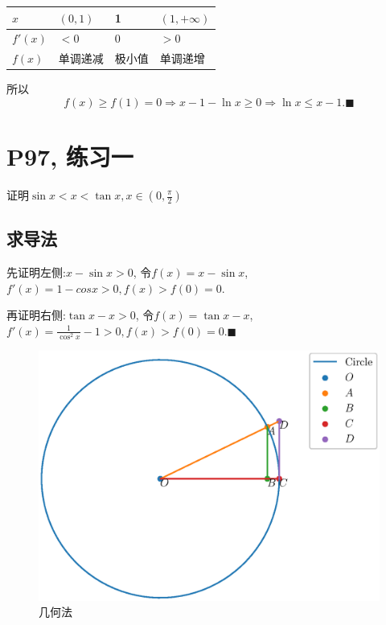 \documentclass{book}
\begin{document}
    \begin{table}[htbp]
        \centering
        \begin{tabular}{|l|l|l|l|}
            \hline
            $x$     & $(0,1)$ & 1   & $(1,+\infty)$ \\ \hline
            $f'(x)$ & $<0$    & 0   & $>0$          \\ \hline
            $f(x)$  & 单调递减    & 极小值 & 单调递增          \\ \hline
        \end{tabular}
    \end{table}

    所以$$f(x)\ge f(1)=0\Longrightarrow x-1-\ln x\ge 0\Longrightarrow \ln x\le x-1.\blacksquare$$

    \section{\textcolor[rgb]{0.11,0.65,0.52}{P97, 练习一}}

    \begin{boxB}
        证明$\displaystyle \sin x<x<\tan x,x\in\left( 0,\frac{\pi}{2} \right)$
    \end{boxB}

    \subsection{求导法}

    先证明左侧:$x-\sin x>0$, 令$f(x)=x-\sin x$, $f'(x)=1-cos x>0,f(x)>f(0)=0$.

    再证明右侧:$\tan x-x>0$, 令$f(x)=\tan x-x$, $\displaystyle f'(x)=\frac{1}{\cos^2x}-1>0,f(x)>f(0)=0$.$\blacksquare$

    \begin{figure}[htbp]
        \centering
        \includegraphics[width=\textwidth]{img/CircleSinTan.eps}
        \caption{几何法}
    \end{figure}
\end{document}
